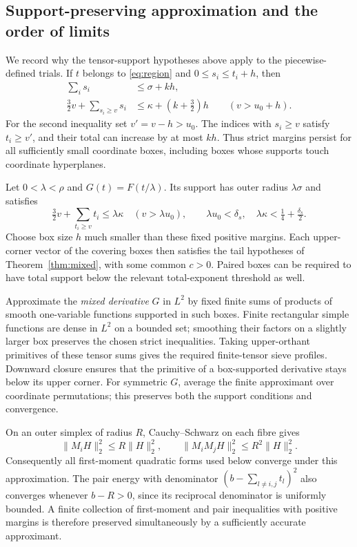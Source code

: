 \documentclass[11pt,a4paper]{article}
\theoremstyle{definition}\newtheorem{definition}[theorem]{Definition}
\theoremstyle{remark}\newtheorem{remark}[theorem]{Remark}
\numberwithin{equation}{section}
\begin{document}
\subsection{Support-preserving approximation and the order of limits}\label{subsec:approx-rigorous}
We record why the tensor-support hypotheses above apply to the piecewise-defined trials. If $t$ belongs to \eqref{eq:region} and $0\le s_i\le t_i+h$, then
\begin{align*}
 \sum_i s_i&\le\sigma+kh,\\
 \tfrac32v+\sum_{s_i\ge v}s_i
 &\le\kappa+(k+\tfrac32)h
 \qquad(v>u_0+h).
\end{align*}
For the second inequality set $v'=v-h>u_0$. The indices with $s_i\ge v$ satisfy $t_i\ge v'$, and their total can increase by at most $kh$. Thus strict margins persist for all sufficiently small coordinate boxes, including boxes whose supports touch coordinate hyperplanes.

Let $0<\lambda<\rho$ and $G(t)=F(t/\lambda)$. Its support has outer radius $\lambda\sigma$ and satisfies
\[
 \tfrac32v+\sum_{t_i\ge v}t_i\le\lambda\kappa
 \quad(v>\lambda u_0),\qquad
 \lambda u_0<\delta_s,\quad
 \lambda\kappa<\tfrac14+\tfrac{\delta_s}2.
\]
Choose box size $h$ much smaller than these fixed positive margins. Each upper-corner vector of the covering boxes then satisfies the tail hypotheses of Theorem~\ref{thm:mixed}, with some common $c>0$. Paired boxes can be required to have total support below the relevant total-exponent threshold as well.

Approximate the \emph{mixed derivative} $G$ in $L^2$ by fixed finite sums of products of smooth one-variable functions supported in such boxes. Finite rectangular simple functions are dense in $L^2$ on a bounded set; smoothing their factors on a slightly larger box preserves the chosen strict inequalities. Taking upper-orthant primitives of these tensor sums gives the required finite-tensor sieve profiles. Downward closure ensures that the primitive of a box-supported derivative stays below its upper corner. For symmetric $G$, average the finite approximant over coordinate permutations; this preserves both the support conditions and convergence.

On an outer simplex of radius $R$, Cauchy--Schwarz on each fibre gives
\[
 \|M_iH\|_2^2\le R\|H\|_2^2,\qquad
 \|M_iM_jH\|_2^2\le R^2\|H\|_2^2.
\]
Consequently all first-moment quadratic forms used below converge under this approximation. The pair energy with denominator $(b-\sum_{l\ne i,j}t_l)^2$ also converges whenever $b-R>0$, since its reciprocal denominator is uniformly bounded. A finite collection of first-moment and pair inequalities with positive margins is therefore preserved simultaneously by a sufficiently accurate approximant.
\end{document}

